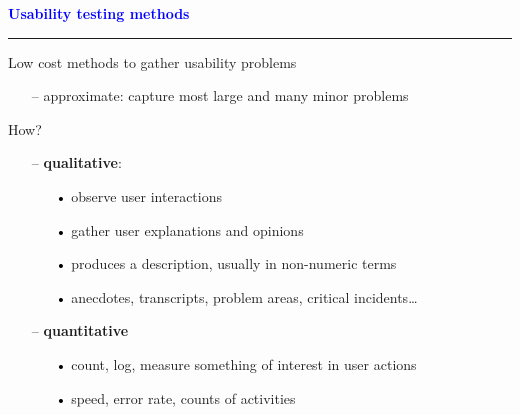 \documentclass[pdf]{beamer}
\begin{document}
{%
{
\begin{frame}
    \textcolor{Blue}{\textbf{\Large{Usability testing methods}}}
    \textcolor{red}{\rule{10cm}{1mm}}\par
    Low cost methods to gather usability problems\par
    \begin{itemize}
    	\item[\textcolor{black}{--}] approximate: capture most large and many minor problems
    \end{itemize}
    How?\par
    \begin{itemize}
    \item[\textcolor{black}{--}] \textbf{qualitative}:
    	\begin{itemize}
    	\item[\textcolor{black}{•}] observe user interactions 
        \item[\textcolor{black}{•}] gather user explanations and opinions 
        \item[\textcolor{black}{•}] produces a description, usually in non-numeric terms
        \item[\textcolor{black}{•}] anecdotes, transcripts, problem areas, critical incidents…
        \end{itemize}
    \item[\textcolor{black}{--}] \textbf{quantitative}
    	\begin{itemize}
    	\item[\textcolor{black}{•}] count, log, measure something of interest in user actions
        \item[\textcolor{black}{•}] speed, error rate, counts of activities
        \end{itemize}
    \end{itemize}
\end{frame}}



}
\end{document}
